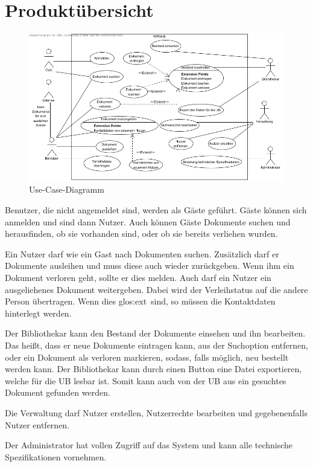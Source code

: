 \chapter{Produktübersicht}

\begin{figure}[h]
\centering
\includegraphics[width=0.8\linewidth]{bilder/use-case.png}
\caption[Use-Case-Diagramm]{Use-Case-Diagramm}
\label{use-case}
\end{figure}


Benutzer, die nicht angemeldet sind, werden als Gäste geführt.
Gäste können sich anmelden und sind dann Nutzer.
Auch können Gäste Dokumente suchen und herausfinden, ob sie vorhanden sind, oder ob sie bereits verliehen wurden.

Ein Nutzer darf wie ein Gast nach Dokumenten suchen.
Zusätzlich darf er Dokumente ausleihen und muss diese auch wieder zurückgeben.
Wenn ihm ein Dokument verloren geht, sollte er dies melden.
Auch darf ein Nutzer ein ausgeliehenes Dokument weitergeben.
Dabei wird der Verleihstatus auf die andere Person übertragen.
Wenn dies \gls{glos:ext}\ sind, so müssen die Kontaktdaten hinterlegt werden.

Der Bibliothekar kann den Bestand der Dokumente einsehen und ihn bearbeiten.
Das heißt, dass er neue Dokumente eintragen kann, aus der Suchoption entfernen, oder ein Dokument als verloren markieren, sodass, falls möglich, neu bestellt werden kann.
Der Bibliothekar kann durch einen Button eine Datei exportieren, welche für die \gls{UB} lesbar ist.
Somit kann auch von der \gls{UB} aus ein gesuchtes Dokument gefunden werden.

Die Verwaltung darf Nutzer erstellen, Nutzerrechte bearbeiten und gegebenenfalls Nutzer entfernen.

Der Administrator hat vollen Zugriff auf das System und kann alle technische Spezifikationen vornehmen.
